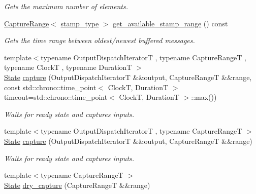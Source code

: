 \begin{DoxyCompactItemize}
\begin{DoxyCompactList}\small\item\em Gets the maximum number of elements. \end{DoxyCompactList}\item 
\mbox{\label{classflow_1_1_captor_interface_aaa637f69db2258f19c516d7e42c94bb4}} 
\hyperlink{structflow_1_1_capture_range}{Capture\+Range}$<$ \hyperlink{classflow_1_1_captor_interface_a2b87d20d17e8d1437941bd98fe514bc8}{stamp\+\_\+type} $>$ \hyperlink{classflow_1_1_captor_interface_aaa637f69db2258f19c516d7e42c94bb4}{get\+\_\+available\+\_\+stamp\+\_\+range} () const
\begin{DoxyCompactList}\small\item\em Gets the time range between oldest/newest buffered messages. \end{DoxyCompactList}\item 
{\footnotesize template$<$typename Output\+Dispatch\+IteratorT , typename Capture\+RangeT , typename ClockT , typename DurationT $>$ }\\\hyperlink{namespaceflow_adefe9726e597eb50c46f0f6a202018e9}{State} \hyperlink{classflow_1_1_captor_interface_ae95095d924214605bfeac70d0bd5ad35}{capture} (Output\+Dispatch\+IteratorT \&\&output, Capture\+RangeT \&\&range, const std\+::chrono\+::time\+\_\+point$<$ ClockT, DurationT $>$ timeout=std\+::chrono\+::time\+\_\+point$<$ ClockT, DurationT $>$\+::max())
\begin{DoxyCompactList}\small\item\em Waits for ready state and captures inputs. \end{DoxyCompactList}\item 
{\footnotesize template$<$typename Output\+Dispatch\+IteratorT , typename Capture\+RangeT $>$ }\\\hyperlink{namespaceflow_adefe9726e597eb50c46f0f6a202018e9}{State} \hyperlink{classflow_1_1_captor_interface_ab645172a3401cc978fd4618a64a83e3d}{capture} (Output\+Dispatch\+IteratorT \&\&output, Capture\+RangeT \&\&range)
\begin{DoxyCompactList}\small\item\em Waits for ready state and captures inputs. \end{DoxyCompactList}\item 
{\footnotesize template$<$typename Capture\+RangeT $>$ }\\\hyperlink{namespaceflow_adefe9726e597eb50c46f0f6a202018e9}{State} \hyperlink{classflow_1_1_captor_interface_a2cd64d7a401f7ee1bfd63ddea2c49f4a}{dry\+\_\+capture} (Capture\+RangeT \&\&range)

\end{DoxyCompactItemize}
